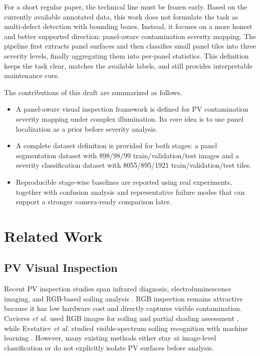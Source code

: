\documentclass[conference]{IEEEtran}
\newcommand{\SegTrain}{898}
\newcommand{\SegVal}{98}
\newcommand{\SegTest}{99}
\newcommand{\ClsTrain}{8055}
\newcommand{\ClsVal}{895}
\newcommand{\ClsTest}{1921}
\begin{document}
For a short regular paper, the technical line must be frozen early. Based on the currently available annotated data, this work does not formulate the task as multi-defect detection with bounding boxes. Instead, it focuses on a more honest and better supported direction: panel-aware contamination severity mapping. The pipeline first extracts panel surfaces and then classifies small panel tiles into three severity levels, finally aggregating them into per-panel statistics. This definition keeps the task clear, matches the available labels, and still provides interpretable maintenance cues.

The contributions of this draft are summarized as follows.
\begin{itemize}
\item A panel-aware visual inspection framework is defined for PV contamination severity mapping under complex illumination. Its core idea is to use panel localization as a prior before severity analysis.
\item A complete dataset definition is provided for both stages: a panel segmentation dataset with \SegTrain/\SegVal/\SegTest{} train/validation/test images and a severity classification dataset with \ClsTrain/\ClsVal/\ClsTest{} train/validation/test tiles.
\item Reproducible stage-wise baselines are reported using real experiments, together with confusion analysis and representative failure modes that can support a stronger camera-ready comparison later.
\end{itemize}

\section{Related Work}
\subsection{PV Visual Inspection}
Recent PV inspection studies span infrared diagnosis, electroluminescence imaging, and RGB-based soiling analysis \cite{ref_review,ref_uavfault}. RGB inspection remains attractive because it has low hardware cost and directly captures visible contamination. Cavieres \textit{et al.} used RGB images for soiling and partial shading assessment \cite{ref_rgbsoiling}, while Evstatiev \textit{et al.} studied visible-spectrum soiling recognition with machine learning \cite{ref_vissoiling}. However, many existing methods either stay at image-level classification or do not explicitly isolate PV surfaces before analysis.
\end{document}

